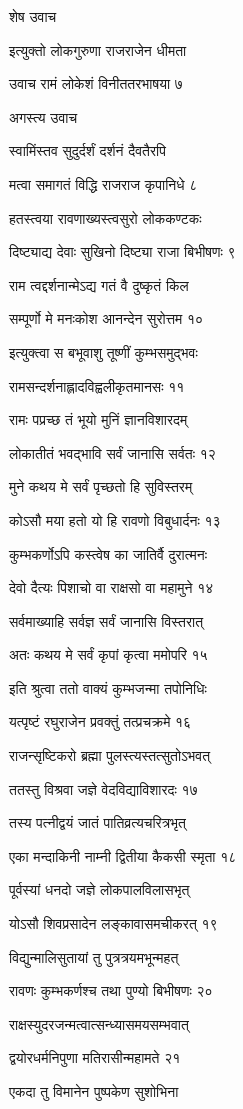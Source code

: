 शेष उवाच

इत्युक्तो लोकगुरुणा राजराजेन धीमता

उवाच रामं लोकेशं विनीततरभाषया ७

अगस्त्य उवाच

स्वामिंस्तव सुदुर्दर्शं दर्शनं दैवतैरपि

मत्वा समागतं विद्धि राजराज कृपानिधे ८

हतस्त्वया रावणाख्यस्त्वसुरो लोककण्टकः

दिष्ट्याद्य देवाः सुखिनो दिष्ट्या राजा बिभीषणः ९

राम त्वद्दर्शनान्मेऽद्य गतं वै दुष्कृतं किल

सम्पूर्णो मे मनःकोश आनन्देन सुरोत्तम १०

इत्युक्त्वा स बभूवाशु तूष्णीं कुम्भसमुद्भवः

रामसन्दर्शनाह्लादविह्वलीकृतमानसः ११

रामः पप्रच्छ तं भूयो मुनिं ज्ञानविशारदम्

लोकातीतं भवद्भावि सर्वं जानासि सर्वतः १२

मुने कथय मे सर्वं पृच्छतो हि सुविस्तरम्

कोऽसौ मया हतो यो हि रावणो विबुधार्दनः १३

कुम्भकर्णोऽपि कस्त्वेष का जातिर्वै दुरात्मनः

देवो दैत्यः पिशाचो वा राक्षसो वा महामुने १४

सर्वमाख्याहि सर्वज्ञ सर्वं जानासि विस्तरात्

अतः कथय मे सर्वं कृपां कृत्वा ममोपरि १५

इति श्रुत्वा ततो वाक्यं कुम्भजन्मा तपोनिधिः

यत्पृष्टं रघुराजेन प्रवक्तुं तत्प्रचक्रमे १६

राजन्सृष्टिकरो ब्रह्मा पुलस्त्यस्तत्सुतोऽभवत्

ततस्तु विश्रवा जज्ञे वेदविद्याविशारदः १७

तस्य पत्नीद्वयं जातं पातिव्रत्यचरित्रभृत्

एका मन्दाकिनी नाम्नी द्वितीया कैकसी स्मृता १८

पूर्वस्यां धनदो जज्ञे लोकपालविलासभृत्

योऽसौ शिवप्रसादेन लङ्कावासमचीकरत् १९

विद्युन्मालिसुतायां तु पुत्रत्रयमभून्महत्

रावणः कुम्भकर्णश्च तथा पुण्यो बिभीषणः २०

राक्षस्युदरजन्मत्वात्सन्ध्यासमयसम्भवात्

द्वयोरधर्मनिपुणा मतिरासीन्महामते २१

एकदा तु विमानेन पुष्पकेण सुशोभिना

